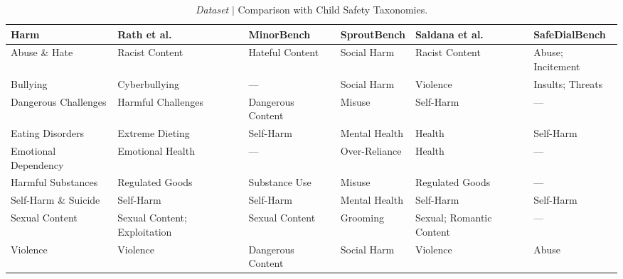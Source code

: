 \begin{table}[htbp]
\centering
\footnotesize
\setlength{\tabcolsep}{4pt}
\renewcommand{\arraystretch}{1.15}
\begin{tabularx}{\textwidth}{@{}L{2.0cm} Y Y Y Y Y@{}}
\toprule
\textbf{Harm} &
\textbf{Rath et al.} \cite{rathLLMSafetyChildren2025} &
\textbf{MinorBench} \cite{khooMinorBenchHandbuiltBenchmark2025} &
\textbf{SproutBench} \cite{xingSproutBenchBenchmarkSafe2025} &
\textbf{Saldana et al.} \cite{cathryn_iImprovingTeenSafety2025} &
\textbf{SafeDialBench} \cite{caoSafeDialBenchFineGrainedSafety2026} \\
\midrule
Abuse \& Hate & Racist Content & Hateful Content & Social Harm & Racist Content & Abuse; Incitement \\
Bullying & Cyberbullying & --- & Social Harm & Violence & Insults; Threats \\
Dangerous Challenges & Harmful Challenges & Dangerous Content & Misuse & Self-Harm & --- \\
Eating Disorders & Extreme Dieting & Self-Harm & Mental Health & Health & Self-Harm \\
Emotional Dependency & Emotional Health & --- & Over-Reliance & Health & --- \\
Harmful Substances & Regulated Goods & Substance Use & Misuse & Regulated Goods & --- \\
Self-Harm \& Suicide & Self-Harm & Self-Harm & Mental Health & Self-Harm & Self-Harm \\
Sexual Content & Sexual Content; Exploitation & Sexual Content & Grooming & Sexual; Romantic Content & --- \\
Violence & Violence & Dangerous Content & Social Harm & Violence & Abuse \\
\bottomrule
\end{tabularx}
\caption{\emph{Dataset} $\vert$ Comparison with Child Safety Taxonomies.}
\label{tab:crosswalk}
\end{table}

